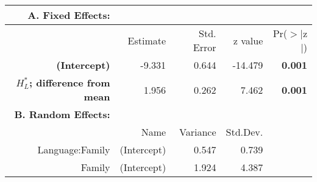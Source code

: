 \begin{tabular}{rrrrr}
 {\bf A. Fixed Effects:} \\
\hline
 & Estimate & Std. Error & z value & Pr($>$$|$z$|$) \\ 
  \hline
{\bf (Intercept) }& -9.331 & 0.644 & -14.479 & {\bf 0.001} \\ 
  {\bf $H^*_L$; difference from mean } & 1.956 & 0.262 & 7.462 & {\bf 0.001} \\ 

\hline \hline
{\bf B. Random Effects:} \\
\hline
& Name & Variance & Std.Dev. \\
\hline
Language:Family & (Intercept) & 0.547 & 0.739 \\
Family & (Intercept) & 1.924 & 4.387 \\
\end{tabular}
